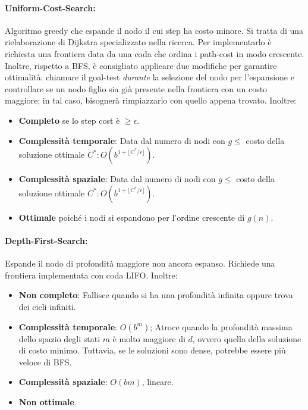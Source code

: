 \paragraph{Uniform-Cost-Search:} Algoritmo greedy che espande il nodo il cui step ha costo minore. Si tratta di una rielaborazione di Dijkstra
specializzato nella ricerca. Per implementarlo è richiesta una frontiera data da una coda che ordina i path-cost in modo crescente. Inoltre, rispetto a
BFS, è consigliato applicare due modifiche per garantire ottimalità: chiamare il goal-test \textit{durante} la selezione del nodo per l'espansione e
controllare se un nodo figlio sia già presente nella frontiera con un costo maggiore; in tal caso, bisognerà rimpiazzarlo con quello appena trovato.
Inoltre: \begin{itemize}
    \item \textbf{Completo} se lo step cost è $\geq \epsilon$.
    \item \textbf{Complessità temporale}: Data dal numero di nodi con $g\leq$ costo della soluzione ottimale $C^*: O(b^{1+\lfloor C^*/\epsilon\rfloor})$.
    \item \textbf{Complessità spaziale}: Data dal numero di nodi con $g\leq$ costo della soluzione ottimale $C^*: O(b^{1+\lfloor C^*/\epsilon\rfloor})$.
    \item \textbf{Ottimale} poiché i nodi si espandono per l'ordine crescente di $g(n)$.
\end{itemize}

\paragraph{Depth-First-Search:} Espande il nodo di profondità maggiore non ancora espanso. Richiede una frontiera implementata con coda LIFO. Inoltre:
\begin{itemize}
    \item \textbf{Non completo}: Fallisce quando si ha una profondità infinita oppure trova dei cicli infiniti.
    \item \textbf{Complessità temporale}: $O(b^m)$; Atroce quando la profondità massima dello spazio degli stati $m$ è molto maggiore di $d$, ovvero
        quella della soluzione di costo minimo. Tuttavia, se le soluzioni sono dense, potrebbe essere più veloce di BFS.
    \item \textbf{Complessità spaziale}: $O(bm)$, lineare.
    \item \textbf{Non ottimale}.
\end{itemize}

